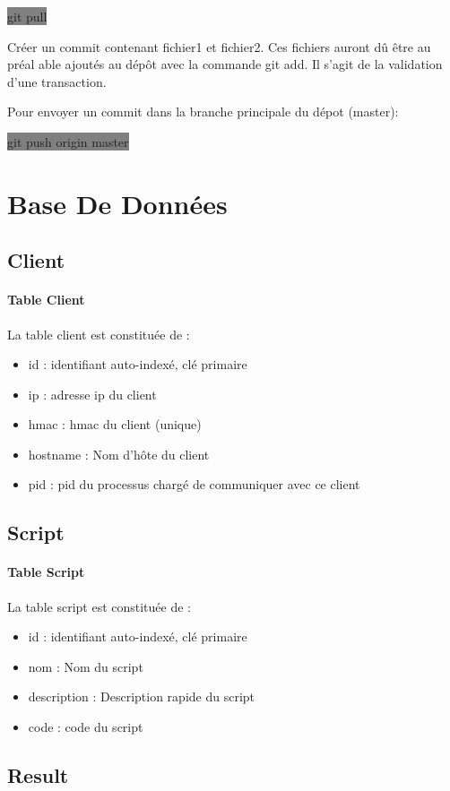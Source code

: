 \documentclass[11pt,a4paper,titlepage, oneside]{article}
\begin{document}
			\colorbox{gray}{git pull}

			Créer un commit contenant fichier1 et fichier2. Ces fichiers auront dû être au préal able ajoutés au dépôt avec la commande git add. Il s'agit de la validation d'une transaction. 

			Pour envoyer un commit dans la branche principale du dépot (master):
			
			\colorbox{gray}{git push origin master}	

\newpage
\section{{\color{red} Base De Données}}
	\subsection{{\color{blue}Client}}
		\paragraph{Table Client}
			La table client est constituée de :
			\begin{itemize}
				\item id : identifiant auto-indexé, clé primaire
				\item ip : adresse ip du client
				\item hmac : hmac du client (unique)
				\item hostname : Nom d'hôte du client
				\item pid : pid du processus chargé de communiquer avec ce client
			\end{itemize}
	\subsection{{\color{blue} Script}}
		\paragraph{Table Script}
			La table script est constituée de :
			\begin{itemize}
				\item id : identifiant auto-indexé, clé primaire
				\item nom : Nom du script
				\item description : Description rapide du script
				\item code : code du script
			\end{itemize}
	\subsection{{\color{blue}Result}}
\end{document}
